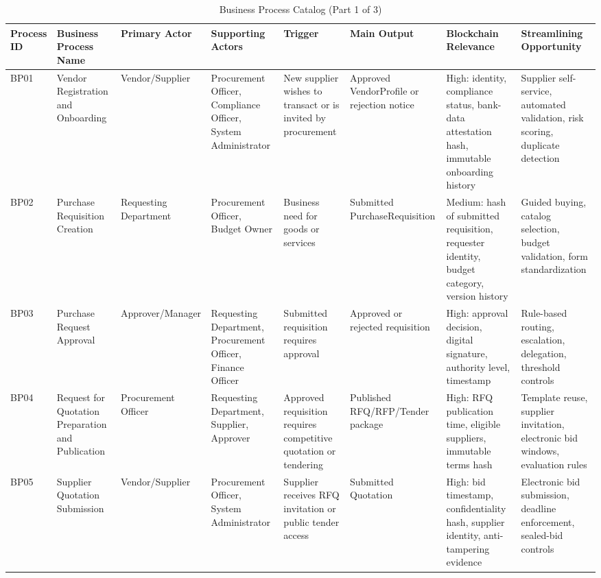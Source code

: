 \documentclass[conference]{IEEEtran}
\begin{document}
\begin{table}[!t]
\caption{Business Process Catalog (Part 1 of 3)}
\label{tab:catalog}
\tiny
\begin{tabularx}{\textwidth}{|L{0.85cm}|L{2.3cm}|L{2.1cm}|L{2.6cm}|Y|L{2.0cm}|Y|Y|}
\hline
\textbf{Process ID} & \textbf{Business Process Name} & \textbf{Primary Actor} & \textbf{Supporting Actors} & \textbf{Trigger} & \textbf{Main Output} & \textbf{Blockchain Relevance} & \textbf{Streamlining Opportunity} \\ \hline
BP01 & Vendor Registration and Onboarding & Vendor/Supplier & Procurement Officer, Compliance Officer, System Administrator & New supplier wishes to transact or is invited by procurement & Approved VendorProfile or rejection notice & High: identity, compliance status, bank-data attestation hash, immutable onboarding history & Supplier self-service, automated validation, risk scoring, duplicate detection \\ \hline
BP02 & Purchase Requisition Creation & Requesting Department & Procurement Officer, Budget Owner & Business need for goods or services & Submitted PurchaseRequisition & Medium: hash of submitted requisition, requester identity, budget category, version history & Guided buying, catalog selection, budget validation, form standardization \\ \hline
BP03 & Purchase Request Approval & Approver/Manager & Requesting Department, Procurement Officer, Finance Officer & Submitted requisition requires approval & Approved or rejected requisition & High: approval decision, digital signature, authority level, timestamp & Rule-based routing, escalation, delegation, threshold controls \\ \hline
BP04 & Request for Quotation Preparation and Publication & Procurement Officer & Requesting Department, Supplier, Approver & Approved requisition requires competitive quotation or tendering & Published RFQ/RFP/Tender package & High: RFQ publication time, eligible suppliers, immutable terms hash & Template reuse, supplier invitation, electronic bid windows, evaluation rules \\ \hline
BP05 & Supplier Quotation Submission & Vendor/Supplier & Procurement Officer, System Administrator & Supplier receives RFQ invitation or public tender access & Submitted Quotation & High: bid timestamp, confidentiality hash, supplier identity, anti-tampering evidence & Electronic bid submission, deadline enforcement, sealed-bid controls \\ \hline
\end{tabularx}
\end{table}
\end{document}
